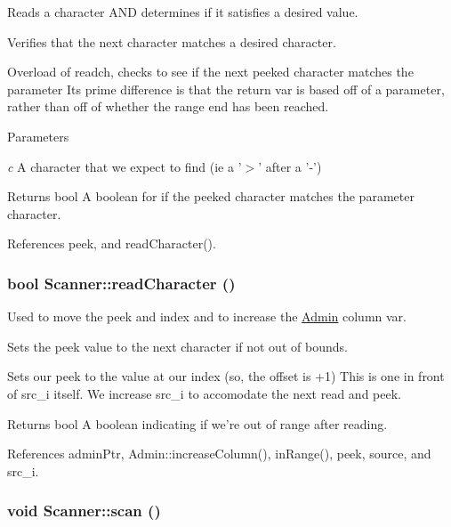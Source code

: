Reads a character AND determines if it satisfies a desired value. 

Verifies that the next character matches a desired character.

Overload of readch, checks to see if the next peeked character matches the parameter Its prime difference is that the return var is based off of a parameter, rather than off of whether the range end has been reached.


\begin{DoxyParams}{Parameters}
\item[{\em c}]A character that we expect to find (ie a '$>$' after a '-\/') \end{DoxyParams}
\begin{DoxyReturn}{Returns}
bool A boolean for if the peeked character matches the parameter character. 
\end{DoxyReturn}


References peek, and readCharacter().

\hypertarget{classScanner_a061b8284e974b60bece52e2758626c5c}{
\subsubsection[{readCharacter}]{\setlength{\rightskip}{0pt plus 5cm}bool Scanner::readCharacter ()}}
\label{classScanner_a061b8284e974b60bece52e2758626c5c}


Used to move the peek and index and to increase the \hyperlink{classAdmin}{Admin} column var. 

Sets the peek value to the next character if not out of bounds.

Sets our peek to the value at our index (so, the offset is +1) This is one in front of src\_\-i itself. We increase src\_\-i to accomodate the next read and peek. \begin{DoxyReturn}{Returns}
bool A boolean indicating if we're out of range after reading. 
\end{DoxyReturn}


References adminPtr, Admin::increaseColumn(), inRange(), peek, source, and src\_\-i.

\hypertarget{classScanner_a83df585ae4ba0622b9b6c107b0581a1c}{
\subsubsection[{scan}]{\setlength{\rightskip}{0pt plus 5cm}void Scanner::scan ()}}
\label{classScanner_a83df585ae4ba0622b9b6c107b0581a1c}


